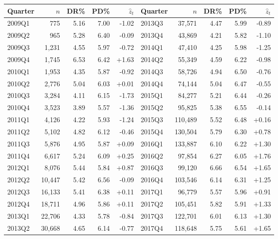 \begin{tabular}{lrrrr|lrrrr}
\toprule
Quarter & $n$ & DR\% & PD\% & $\hat z_t$ & Quarter & $n$ & DR\% & PD\% & $\hat z_t$ \\
\midrule
2009Q1 & 775 & 5.16 & 7.00 & -1.02 & 2013Q3 & 37,571 & 4.47 & 5.99 & -0.89 \\
2009Q2 & 965 & 5.28 & 6.40 & -0.09 & 2013Q4 & 43,869 & 4.21 & 5.82 & -1.10 \\
2009Q3 & 1,231 & 4.55 & 5.97 & -0.72 & 2014Q1 & 47,410 & 4.25 & 5.98 & -1.25 \\
2009Q4 & 1,745 & 6.53 & 6.42 & +1.63 & 2014Q2 & 55,349 & 4.59 & 6.22 & -0.98 \\
2010Q1 & 1,953 & 4.35 & 5.87 & -0.92 & 2014Q3 & 58,726 & 4.94 & 6.50 & -0.76 \\
2010Q2 & 2,776 & 5.04 & 6.03 & +0.01 & 2014Q4 & 74,144 & 5.04 & 6.47 & -0.55 \\
2010Q3 & 3,284 & 4.11 & 6.15 & -1.73 & 2015Q1 & 84,277 & 5.21 & 6.44 & -0.26 \\
2010Q4 & 3,523 & 3.89 & 5.57 & -1.36 & 2015Q2 & 95,825 & 5.38 & 6.55 & -0.14 \\
2011Q1 & 4,126 & 4.22 & 5.93 & -1.24 & 2015Q3 & 110,489 & 5.52 & 6.48 & +0.16 \\
2011Q2 & 5,102 & 4.82 & 6.12 & -0.46 & 2015Q4 & 130,504 & 5.79 & 6.30 & +0.78 \\
2011Q3 & 5,876 & 4.95 & 5.87 & +0.09 & 2016Q1 & 133,887 & 6.10 & 6.22 & +1.30 \\
2011Q4 & 6,617 & 5.24 & 6.09 & +0.25 & 2016Q2 & 97,854 & 6.27 & 6.05 & +1.76 \\
2012Q1 & 8,076 & 5.44 & 5.84 & +0.87 & 2016Q3 & 99,120 & 6.66 & 6.54 & +1.65 \\
2012Q2 & 10,447 & 5.42 & 6.56 & -0.09 & 2016Q4 & 103,546 & 6.14 & 6.31 & +1.25 \\
2012Q3 & 16,133 & 5.41 & 6.38 & +0.11 & 2017Q1 & 96,779 & 5.57 & 5.96 & +0.91 \\
2012Q4 & 18,711 & 4.96 & 5.86 & +0.11 & 2017Q2 & 105,451 & 5.82 & 5.91 & +1.33 \\
2013Q1 & 22,706 & 4.33 & 5.78 & -0.84 & 2017Q3 & 122,701 & 6.01 & 6.13 & +1.30 \\
2013Q2 & 30,668 & 4.65 & 6.14 & -0.77 & 2017Q4 & 118,648 & 5.75 & 5.61 & +1.65 \\
\bottomrule
\end{tabular}
